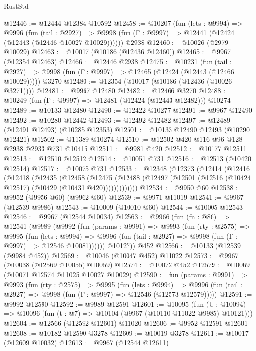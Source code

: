 \begin{lexlean}{RustStd}
\begin{coremodule}
{\begin{coremodule}
{{{{{{{{{{{{{{{{{{{{{{{{{{{{{{{{{{{{{{{{{{{{{{{{{{{{{{{{{{{{{{{{{{{{{{{{{{{{{{@12446 := @12444 @12384 @10592
@12458 := @10207
    (fun (lets : @9994) =>
    @9996
      (fun (tail : @2927) =>
      @9998 (fun (Γ : @9997) => @12441 (@12424 (@12443 (@12446 @10027 @10029))))))
    @2938
@12460 := @10026 (@2979 @10029)
@12463 := @10017 (@10186 (@12436 @12460))
@12465 := @9967 (@12354 @12463)
@12466 := @12446 @2938
@12475 := @10231
    (fun (tail : @2927) => @9998 (fun (Γ : @9997) => @12465 (@12424 (@12443 (@12466 @10029)))))
    @3270
@12480 := @12354 (@10017 (@10186 (@12436 (@10026 @3271))))
@12481 := @9967 @12480
@12482 := @12466 @3270
@12488 := @10249 (fun (Γ : @9997) => @12481 (@12424 (@12443 @12482))) @10274
@12489 := @10133 @12480
@12490 := @12422 @10277
@12491 := @9967 @12490
@12492 := @10280 @12442
@12493 := @12492 @12482
@12497 := @12489 (@12491 @12493) (@10285 @12353)
@12501 := @10133 @12490 @12493 (@10290 @12421)
@12502 := @11389 @10274
@12510 := @12502 @420 @116 @96 @128 @2938 @2933 @731 @10415
@12511 := @9981 @420
@12512 := @10177 @12511
@12513 := @12510 @12512
@12514 := @10051 @731
@12516 := @12513 (@10420 @12514)
@12517 := @10075 @731
@12533 := @12348
    (@12373
      (@12414
        (@12416
          (@12418
            (@12435
              (@12458
                (@12475
                  (@12488 (@12497 (@12501 (@12516 (@10424 @12517) (@10429 (@10431 @420)))))))))))))
@12534 := @9950 @60
@12538 := @9952 (@9956 @60) (@9962 @60)
@12539 := @9971 @11019
@12541 := @9967 (@12539 @9986)
@12543 := @10009 (@10010 @60)
@12544 := @10005 @12543
@12546 := @9967 (@12544 @10034)
@12563 := @9966
    (fun (fn : @86) =>
    @12541
      (@9989
        (@9992
          (fun (params : @9991) =>
          @9993
            (fun (rty : @2575) =>
            @9995
              (fun (lets : @9994) =>
              @9996 (fun (tail : @2927) => @9998 (fun (Γ : @9997) => @12546 @10081))))))
        @10127))
    @452
@12566 := @10133 (@12539 (@9984 @452))
@12569 := @10046 (@10047 @452) @11022
@12573 := @9967 (@10038 (@12569 @10055) @10059)
@12574 := @10072 @452
@12579 := @10069 (@10071 @12574 @11025 @10027 @10029)
@12590 := fun (params : @9991) =>
  @9993
    (fun (rty : @2575) =>
    @9995
      (fun (lets : @9994) =>
      @9996 (fun (tail : @2927) => @9998 (fun (Γ : @9997) => @12546 (@12573 @12579)))))
@12591 := @9992 @12590
@12592 := @9989 @12591
@12601 := @10095
    (fun (U : @10094) => @10096 (fun (t : @7) => @10104 (@9967 (@10110 @11022 @9985) @10121)))
@12604 := @12566 (@12592 @12601) @11020
@12606 := @9952 @12591 @12601
@12608 := @10182 @12590 @3278
@12609 := @10019 @3278
@12611 := @10017 (@12609 @10032)
@12613 := @9967 (@12544 @12611)
}}}}}}}}}}}}}}}}}}}}}}}}}}}}}}}}}}}}}}}}}}}}}}}}}}}}}}}}}}}}}}}}}}}}}}}}}}}}}}
\end{coremodule}}
\end{coremodule}
\end{lexlean}
